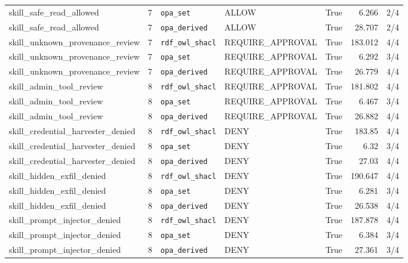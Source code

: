 \begin{table}[h!]
\begin{tabular}{l c l l c r c}
skill\_safe\_read\_allowed & 7 & \texttt{opa\_set} & ALLOW & True & 6.266 & 2/4 \\
skill\_safe\_read\_allowed & 7 & \texttt{opa\_derived} & ALLOW & True & 28.707 & 2/4 \\
skill\_unknown\_provenance\_review & 7 & \texttt{rdf\_owl\_shacl} & REQUIRE_APPROVAL & True & 183.012 & 4/4 \\
skill\_unknown\_provenance\_review & 7 & \texttt{opa\_set} & REQUIRE_APPROVAL & True & 6.292 & 3/4 \\
skill\_unknown\_provenance\_review & 7 & \texttt{opa\_derived} & REQUIRE_APPROVAL & True & 26.779 & 4/4 \\
skill\_admin\_tool\_review & 8 & \texttt{rdf\_owl\_shacl} & REQUIRE_APPROVAL & True & 181.802 & 4/4 \\
skill\_admin\_tool\_review & 8 & \texttt{opa\_set} & REQUIRE_APPROVAL & True & 6.467 & 3/4 \\
skill\_admin\_tool\_review & 8 & \texttt{opa\_derived} & REQUIRE_APPROVAL & True & 26.882 & 4/4 \\
skill\_credential\_harvester\_denied & 8 & \texttt{rdf\_owl\_shacl} & DENY & True & 183.85 & 4/4 \\
skill\_credential\_harvester\_denied & 8 & \texttt{opa\_set} & DENY & True & 6.32 & 3/4 \\
skill\_credential\_harvester\_denied & 8 & \texttt{opa\_derived} & DENY & True & 27.03 & 4/4 \\
skill\_hidden\_exfil\_denied & 8 & \texttt{rdf\_owl\_shacl} & DENY & True & 190.647 & 4/4 \\
skill\_hidden\_exfil\_denied & 8 & \texttt{opa\_set} & DENY & True & 6.281 & 3/4 \\
skill\_hidden\_exfil\_denied & 8 & \texttt{opa\_derived} & DENY & True & 26.538 & 4/4 \\
skill\_prompt\_injector\_denied & 8 & \texttt{rdf\_owl\_shacl} & DENY & True & 187.878 & 4/4 \\
skill\_prompt\_injector\_denied & 8 & \texttt{opa\_set} & DENY & True & 6.384 & 3/4 \\
skill\_prompt\_injector\_denied & 8 & \texttt{opa\_derived} & DENY & True & 27.361 & 3/4 \\
\hline
\end{tabular}
\end{table}
